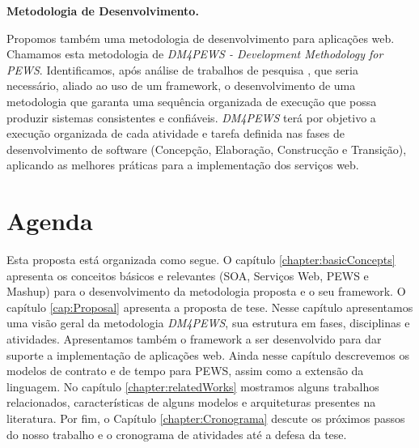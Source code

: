 \textbf{Metodologia de Desenvolvimento.}
  
Propomos também uma metodologia de desenvolvimento para aplicações web.
Chamamos esta metodologia de \textit{DM4PEWS - Development Methodology for
PEWS}. Identificamos, após análise de trabalhos de pesquisa \cite{ChengGCM09, Espinosa-OviedoVZC09, MorseBPMTM04, KoutsoukosKANS06}, que
seria necessário, aliado ao uso de um framework, o desenvolvimento de uma
metodologia que garanta uma sequência organizada de execução que possa produzir
sistemas consistentes e confiáveis. \textit{DM4PEWS} terá por objetivo a
execução organizada de cada atividade e tarefa definida nas fases de desenvolvimento de software (Concepção, Elaboração,
Construcção e Transição), aplicando as melhores práticas para a implementação
dos serviços web.

\section{Agenda}
\label{sec:Intro-outline}

Esta proposta está organizada como segue. O capítulo
\ref{chapter:basicConcepts} apresenta os conceitos básicos e relevantes (SOA,
Serviços Web, PEWS e Mashup) para o desenvolvimento da metodologia proposta e o
seu framework. O capítulo \ref{cap:Proposal} apresenta a proposta de tese.
Nesse capítulo apresentamos uma visão geral da metodologia \textit{DM4PEWS},
sua estrutura em fases, disciplinas e atividades. Apresentamos também o
framework a ser desenvolvido para dar suporte a implementação de aplicações
web. Ainda nesse capítulo descrevemos os modelos de contrato e de tempo para
PEWS, assim como a extensão da linguagem. No capítulo \ref{chapter:relatedWorks}
mostramos alguns trabalhos relacionados, características de alguns modelos e
arquiteturas presentes na literatura. Por fim, o Capítulo
\ref{chapter:Cronograma} descute os próximos passos do nosso trabalho e
o cronograma de atividades até a defesa da tese.

